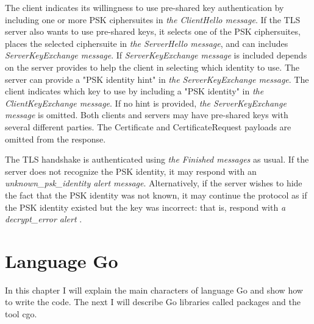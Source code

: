\documentclass[
  digital, %
  notable,   %
  lof,     %
  lot,     %
]{fithesis3}
\begin{document}
The client indicates its willingness to use pre-shared key authentication by including one or 
more PSK ciphersuites in \textit{the ClientHello message}. If the TLS server also wants to use 
pre-shared keys, it selects one of the PSK ciphersuites, places the selected ciphersuite in 
\textit{the ServerHello message}, and can includes \textit{ServerKeyExchange message}. If 
\textit{ServerKeyExchange message} is included depends on the server provides to help the 
client in selecting which identity to use. The server can provide a "PSK identity hint" in 
\textit{the ServerKeyExchange message}. The client indicates which key to use by including a 
"PSK identity" in \textit{the ClientKeyExchange message}. If no hint is provided, \textit{the 
ServerKeyExchange message} is omitted. Both clients and servers may have pre-shared keys with 
several different parties. The Certificate and CertificateRequest payloads are omitted from 
the response.

The TLS handshake is authenticated using \textit{the Finished messages} as usual. If the 
server does not recognize the PSK identity, it may respond with an 
\textit{unknown\_psk\_identity alert message}.  Alternatively, if the server wishes to hide 
the fact that the PSK identity was not known, it may continue the protocol as if the PSK 
identity existed but the key was incorrect: that is, respond with \textit{a decrypt\_error 
alert} \cite{eronen2005pre}. 

\chapter{Language Go}
In this chapter I will explain the main characters of language Go and show how to write the 
code. The next I will describe Go libraries called packages and the tool cgo.
\end{document}
